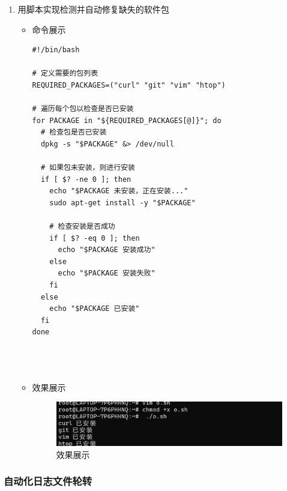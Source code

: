 \documentclass[UTF8]{ctexart}
\begin{document}
\begin{enumerate}
  \item 用脚本实现检测并自动修复缺失的软件包
  \begin{itemize}
  \item 命令展示
  \begin{verbatim}
#!/bin/bash

# 定义需要的包列表
REQUIRED_PACKAGES=("curl" "git" "vim" "htop")

# 遍历每个包以检查是否已安装
for PACKAGE in "${REQUIRED_PACKAGES[@]}"; do
  # 检查包是否已安装
  dpkg -s "$PACKAGE" &> /dev/null
  
  # 如果包未安装，则进行安装
  if [ $? -ne 0 ]; then
    echo "$PACKAGE 未安装，正在安装..."
    sudo apt-get install -y "$PACKAGE"
    
    # 检查安装是否成功
    if [ $? -eq 0 ]; then
      echo "$PACKAGE 安装成功"
    else
      echo "$PACKAGE 安装失败"
    fi
  else
    echo "$PACKAGE 已安装"
  fi
done


    
  \end{verbatim}

  \item 效果展示
  \begin{figure}[H]
    \centering
    \includegraphics[width=\textwidth]{8} %
    \caption{效果展示}
  
  \end{figure}
\end{itemize}
\end{enumerate}
\subsubsection{自动化日志文件轮转}
\end{document}
